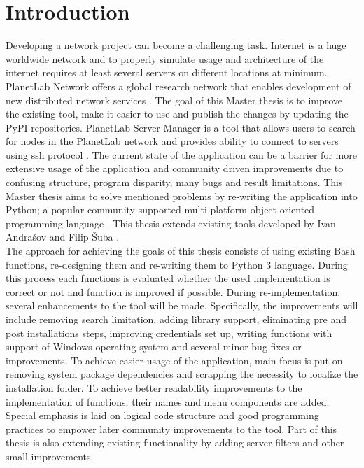 \chapter*{Introduction}
{}

Developing a network project can become a challenging task. Internet is a huge worldwide network and to properly simulate usage and architecture of the internet requires at least several servers on different locations at minimum. PlanetLab Network offers a global research network that enables development of new distributed network services \cite{planetlababout}. The goal of this Master thesis is to improve the existing tool, make it easier to use and publish the changes by updating the PyPI repositories. PlanetLab Server Manager is a tool that allows users to search for nodes in the PlanetLab network and provides ability to connect to servers using ssh protocol \cite{andrasov2}. The current state of the application can be a barrier for more extensive usage of the application and community driven improvements due to confusing structure, program disparity, many bugs and result limitations. This Master thesis aims to solve mentioned problems by re-writing the application into Python; a popular community supported multi-platform object oriented programming language \cite{lutz2013learning}. This thesis extends existing tools developed by Ivan Andrašov \cite{andrasov2} and Filip Šuba \cite{suba1}.\\
The approach for achieving the goals of this thesis consists of using existing Bash functions, re-designing them and re-writing them to Python 3 language. During this process each functions is evaluated whether the used implementation is correct or not and function is improved if possible. During re-implementation, several enhancements to the tool will be made. Specifically, the improvements will include removing search limitation, adding library support, eliminating pre and post installations steps, improving credentials set up, writing functions with support of Windows operating system and several minor bug fixes or improvements. To achieve easier usage of the application, main focus is put on removing system package dependencies and scrapping the necessity to localize the installation folder. To achieve better readability improvements to the implementation of functions, their names and menu components are added. Special emphasis is laid on logical code structure and good programming practices to empower later community improvements to the tool. Part of this thesis is also extending existing functionality by adding server filters and other small improvements.\\
